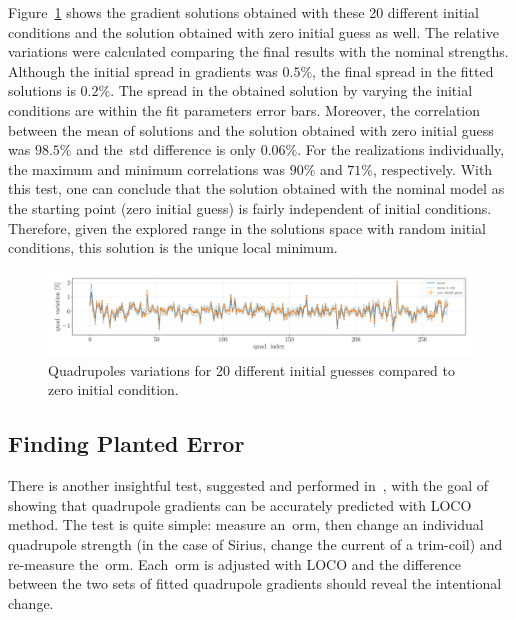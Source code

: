 Figure~\ref{fig:quad_stren_ini_guess} shows the gradient solutions obtained with these 20 different initial conditions and the solution obtained with zero initial guess as well. The relative variations were calculated comparing the final results with the nominal strengths. Although the initial spread in gradients was $0.5\%$, the final spread in the fitted solutions is $0.2\%$. The spread in the obtained solution by varying the initial conditions are within the fit parameters error bars. Moreover, the correlation between the mean of solutions and the solution obtained with zero initial guess was $98.5\%$ and the~\gls{std} difference is only $0.06\%$. For the realizations individually, the maximum and minimum correlations was $90\%$ and $71\%$, respectively. With this test, one can conclude that the solution obtained with the nominal model as the starting point (zero initial guess) is fairly independent of initial conditions. Therefore, given the explored range in the solutions space with random initial conditions, this solution is the unique local minimum.
\begin{figure}
\centering
\includegraphics[width=1.0\textwidth]{figures/quad_stren_initial_guess.pdf}
\caption{Quadrupoles variations for 20 different initial guesses compared to zero initial condition.}
\label{fig:quad_stren_ini_guess}
\end{figure}
\subsection{Finding Planted Error}
There is another insightful test, suggested and performed in~\cite{safranek1997}, with the goal of showing that quadrupole gradients can be accurately predicted with LOCO method. The test is quite simple: measure an~\gls{orm}, then change an individual quadrupole strength (in the case of Sirius, change the current of a trim-coil) and re-measure the~\gls{orm}. Each~\gls{orm} is adjusted with LOCO and the difference between the two sets of fitted quadrupole gradients should reveal the intentional change.

